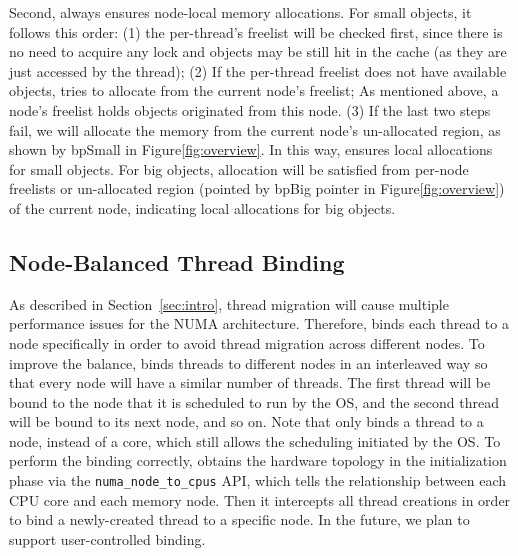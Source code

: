 Second, \NM{} always ensures node-local memory allocations. For small objects, it follows this order: (1) the per-thread's freelist will be checked first, since there is no need to acquire any lock and objects may be still hit in the cache (as they are just accessed by the thread); (2) If the per-thread freelist does not have available objects, \NM{} tries to allocate from the current node's freelist; As mentioned above, a node's freelist holds objects originated from this node. (3) If the last two steps fail,  we will allocate the memory from the current node's un-allocated region, as shown by bpSmall in Figure\ref{fig:overview}. In this way, 
\NM{} ensures local allocations for small objects. For big objects, allocation will be satisfied from per-node freelists or un-allocated region (pointed by bpBig pointer in Figure\ref{fig:overview}) of the current node, indicating local allocations for big objects. 

\subsection{Node-Balanced Thread Binding} 
\label{sec:balance}
As described in Section~\ref{sec:intro}, thread migration will cause multiple performance issues for the NUMA architecture. Therefore, \NM{} binds each thread to a node specifically in order to avoid thread migration across different nodes. To improve the balance, \NM{} binds threads to different nodes in an interleaved way so that every node will have a similar number of threads. The first thread will be bound to the node that it is scheduled to run by the OS, and the second thread will be bound to its next node, and so on. Note that \NM{} only binds a thread to a node, instead of a core, which still allows the scheduling initiated by the OS. To perform the binding correctly, \NM{} obtains the hardware topology in the initialization phase via the \texttt{numa\_node\_to\_cpus} API, which tells the relationship between each CPU core and each memory node. Then it intercepts all thread creations in order to bind a newly-created thread to a specific node. In the future, we plan to support user-controlled binding.


